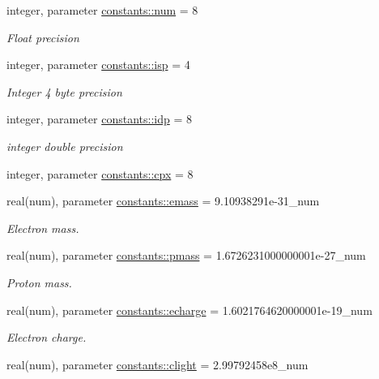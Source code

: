 \begin{DoxyCompactItemize}
\item 
integer, parameter \hyperlink{namespaceconstants_afe19f7f8af171411c51fb763b36e3823}{constants\+::num} = 8
\begin{DoxyCompactList}\small\item\em Float precision \end{DoxyCompactList}\item 
integer, parameter \hyperlink{namespaceconstants_a5a2ae450a00d2a29f9b70dcb776f7a2f}{constants\+::isp} = 4
\begin{DoxyCompactList}\small\item\em Integer 4 byte precision \end{DoxyCompactList}\item 
integer, parameter \hyperlink{namespaceconstants_ae345db51770e3628e6aaf76e6a45e160}{constants\+::idp} = 8
\begin{DoxyCompactList}\small\item\em integer double precision \end{DoxyCompactList}\item 
integer, parameter \hyperlink{namespaceconstants_a5709f0ae2ee52b1906446ad25ed0f587}{constants\+::cpx} = 8
\item 
real(num), parameter \hyperlink{namespaceconstants_ad39536f583f0861abb2fb19a27c56fc8}{constants\+::emass} = 9.\+10938291e-\/31\+\_\+num
\begin{DoxyCompactList}\small\item\em Electron mass. \end{DoxyCompactList}\item 
real(num), parameter \hyperlink{namespaceconstants_a44f3d8cbf9c39db63d7533d985cc51c3}{constants\+::pmass} = 1.\+6726231000000001e-\/27\+\_\+num
\begin{DoxyCompactList}\small\item\em Proton mass. \end{DoxyCompactList}\item 
real(num), parameter \hyperlink{namespaceconstants_af0f1098f6be55eab4174890ed5caaf98}{constants\+::echarge} = 1.\+6021764620000001e-\/19\+\_\+num
\begin{DoxyCompactList}\small\item\em Electron charge. \end{DoxyCompactList}\item 
real(num), parameter \hyperlink{namespaceconstants_ac23d8857383002cada2aa571fd859533}{constants\+::clight} = 2.\+99792458e8\+\_\+num

\end{DoxyCompactItemize}

